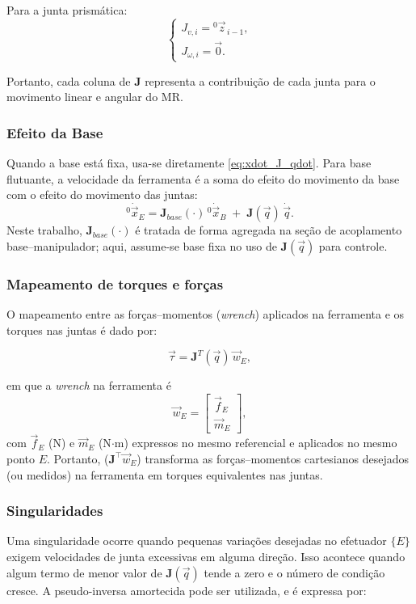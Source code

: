 Para a junta prismática:
\begin{equation}
\begin{cases}
J_{v,i} = {}^{0}\!\vec{z}_{\,i-1}, \\
J_{\omega,i} = \vec 0.
\end{cases}
\end{equation}

Portanto, cada coluna de $\mathbf{J}$ representa a contribuição de cada junta para o movimento linear e angular do MR.

\subsubsection{Efeito da Base}
Quando a base está fixa, usa-se diretamente
\eqref{eq:xdot_J_qdot}.
Para base flutuante, a velocidade da ferramenta é a soma do efeito do movimento da base com o efeito do movimento das juntas:
\begin{equation}
{}^{0}\!\dot{\vec x}_{E} =
\mathbf{J}_{base}(\cdot)\,{}^{0}\!\dot{\vec x}_{B}
\;+\;
\mathbf{J}(\vec q)\,\dot{\vec q}.
\end{equation}
Neste trabalho, $\mathbf{J}_{base}(\cdot)$ é tratada de forma agregada na seção de acoplamento base--manipulador; aqui, assume-se base fixa no uso de $\mathbf{J}(\vec q)$ para controle.

\subsubsection{Mapeamento de torques e forças}
O mapeamento entre as forças--momentos (\emph{wrench}) aplicados na ferramenta e os torques nas juntas é dado por:

\begin{equation}
\vec\tau = \mathbf{J}^T (\vec q)\,\vec w_{E},
\end{equation}

em que a \emph{wrench} na ferramenta é
\begin{equation}
\vec w_{E} =
\begin{bmatrix}
\vec f_{E} \\
\vec m_{E}
\end{bmatrix},
\end{equation}
com $\vec f_{E}$ (N) e $\vec m_{E}$ (N$\cdot$m) expressos no mesmo referencial e aplicados no mesmo ponto $E$.
Portanto, ($\mathbf{J}^{\top}\vec w_{E}$) transforma as forças--momentos cartesianos desejados (ou medidos) na ferramenta em torques equivalentes nas juntas.

\subsubsection{Singularidades}
Uma singularidade ocorre quando pequenas variações desejadas no efetuador $\{E\}$ exigem velocidades de junta excessivas em alguma direção.
Isso acontece quando algum termo de menor valor de $\mathbf{J}(\vec q)$ tende a zero e o número de condição cresce.
A pseudo-inversa amortecida pode ser utilizada, e é expressa por:

